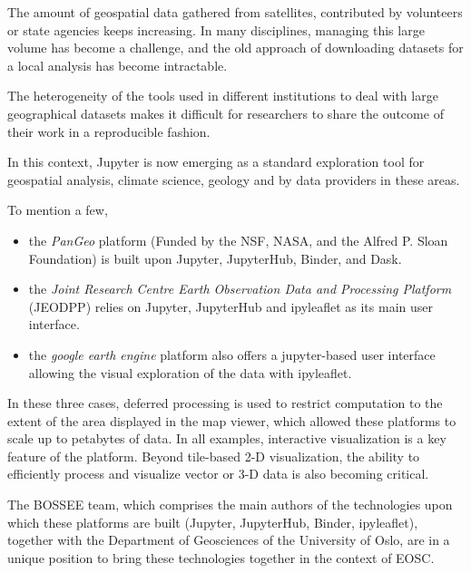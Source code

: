 \begin{task}[
  title=Geosciences application,
  id=geoscience,
  lead=UIO,
  PM=24,
  wphases={0-48},
  partners={UIO,QS,SRL}
]


The amount of geospatial data gathered from satellites, contributed by volunteers
or state agencies keeps increasing. In many disciplines, managing this large volume
has become a challenge, and the old approach of downloading datasets for a local
analysis has become intractable.

The heterogeneity of the tools used in different institutions to deal with
large geographical datasets makes it difficult for researchers to share the outcome
of their work in a reproducible fashion.

In this context, Jupyter is now emerging as a standard exploration tool for
geospatial analysis, climate science, geology and by data providers in these areas.

To mention a few,

\begin{itemize}
\item
   the \emph{PanGeo} platform (Funded by the NSF, NASA, and the Alfred P.
   Sloan Foundation) is built upon Jupyter, JupyterHub, Binder, and Dask.
\item
   the \emph{Joint Research Centre Earth Observation Data and Processing Platform}
   (JEODPP) relies on Jupyter, JupyterHub and ipyleaflet as its main user
   interface.
\item
   the \emph{google earth engine} platform also offers a jupyter-based user
   interface allowing the visual exploration of the data with ipyleaflet.
\end{itemize}

In these three cases, deferred processing is used to restrict computation to
the extent of the area displayed in the map viewer, which allowed these
platforms to scale up to petabytes of data. In all examples, interactive
visualization is a key feature of the platform. Beyond tile-based
2-D visualization, the ability to efficiently process and visualize vector
or 3-D data is also becoming critical.

The BOSSEE team, which comprises the main authors of the technologies upon
which these platforms are built (Jupyter, JupyterHub, Binder, ipyleaflet),
together with the Department of Geosciences of the University of Oslo, are
in a unique position to bring these technologies together in the context of
EOSC.


\end{task}
